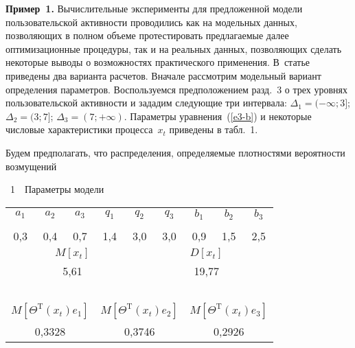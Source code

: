 \begin{multicols}{2}
  \smallskip
  
  \noindent
  \textbf{Пример~1.} Вычислительные эксперименты для предложенной модели 
пользовательской актив\-ности проводились как на модельных данных, позволяющих в 
полном объеме протестировать предлагаемые далее оптимизационные процедуры, так и на 
реальных данных, позволяющих сделать некоторые выводы о возможностях практического 
применения. В~статье приведены два варианта расчетов. Вначале рассмотрим модельный 
вариант определения параметров. Воспользуемся предположением разд.~3 о трех уровнях 
пользовательской активности и зададим следующие три интервала: $\Delta_1=(-\infty;3]$; 
$\Delta_2=(3;7]$; $\Delta_3=(7;+\infty)$. Параметры уравнения~(\ref{e3-b}) и некоторые 
числовые характеристики процесса~$x_t$ приведены в табл.~1.
  
  Будем предполагать, что распределения, определяемые плотностями вероятности 
возмущений\linebreak\vspace*{-12pt}
\columnbreak

\noindent
\begin{center}
\noindent
{\tablename~1}\ \ \small{Параметры модели}
\end{center}

\begin{center}
   
 {\small  \begin{tabular}{|c|c|c|c|p{1pt}p{1pt}|c|c|c|c|}
   \hline
$a_1$&$a_2$&$a_3$&$q_1$&\multicolumn{2}{c|}{$q_2$}&$q_3$&$b_1$&$b_2$&$b_3$\\
&&&&\hspace*{1pt}&\hspace*{1pt}
&&&&\\[-12pt]
\hline
0,3&0,4&0,7&1,4&\multicolumn{2}{c|}{3{,}0}&3,0&0,9&1,5&2,5\\
\hline
\multicolumn{5}{|c|}{$M[x_t]$ }&\multicolumn{5}{c|}{$D[x_t]$ }\\
\hline
\multicolumn{5}{|c|}{5,61}&\multicolumn{5}{c|}{19,77}\\
\hline
\multicolumn{3}{|c|}{\ } & \multicolumn{4}{c|}{\ } & \multicolumn{3}{c|}{\ }\\[-9pt]
\multicolumn{3}{|c|}{$M[\Theta^{\mathrm{T}}(x_t)e_1]$} &\multicolumn{4}{c|}{$M[\Theta^{\mathrm{T}}(x_t) e_2]$} 
&\multicolumn{3}{c|}{$M[\Theta^{\mathrm{T}}(x_t)e_3]$}\\
\hline
\multicolumn{3}{|c|}{0{,}3328}&\multicolumn{4}{c|}{0{,}3746}&\multicolumn{3}{c|}{0{,}2926}\\
\hline
\end{tabular}
}
\end{center}
\vspace*{12pt}


\end{multicols}
